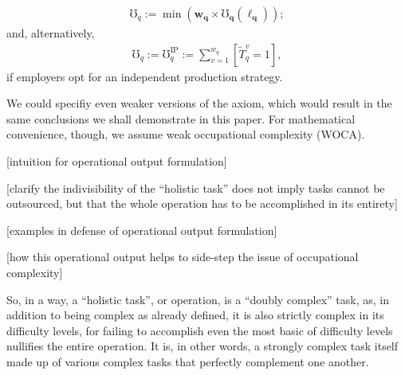 \documentclass[hidelinks, nonatbib]{elsarticle}
\begin{document}
\begin{axiom}
\begin{subaxiom}
\begin{gather}
            \mho_q
            :=
            \min\left(
                \boldsymbol{w_q}
                \times
                \boldsymbol{\mho_q}(
                    \boldsymbol{\ell_q}
                )
            \right)
            ;
        \end{gather}
        and, alternatively,
        \begin{gather}
            \mho_q
            :=
            \mho_{q}^{\text{IP}}
            :=
            \sum_{v=1}^{w_q}{
                \left[
                    \tilde{T}_{q}^{v}
                    =
                    1
                \right]
            }
            ,
        \end{gather}
        if employers opt for an independent production strategy.
    \end{subaxiom}

    We could specifiy even weaker versions of the axiom, which would result in the same conclusions we shall demonstrate in this paper. For mathematical convenience, though, we assume weak occupational complexity (WOCA).

    [intuition for operational output formulation]
    
    [clarify the indivisibility of the ``holistic task'' does not imply tasks cannot be outsourced, but that the whole operation has to be accomplished in its entirety]

    [examples in defense of operational output formulation]
    
    [how this operational output helps to side-step the issue of occupational complexity]

    So, in a way, a ``holistic task'', or operation, is a ``doubly complex'' task, as, in addition to being complex as already defined, it is also strictly complex in its difficulty levels, for failing to accomplish even the most basic of difficulty levels nullifies the entire operation. It is, in other words, a strongly complex task itself made up of various complex tasks that perfectly complement one another.


\end{axiom}
\end{document}
